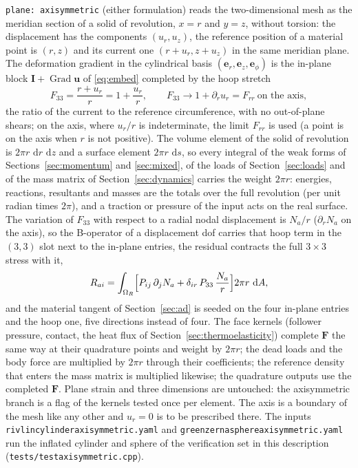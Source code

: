 \documentclass[11pt]{article}
\newcommand{\ud}{\,\mathrm{d}}
\newcommand{\Grad}{\operatorname{Grad}}
\newcommand{\bu}{\bm{u}}
\newcommand{\be}{\bm{e}}
\newcommand{\bF}{\bm{F}}
\newcommand{\bI}{\bm{I}}
\DeclareRobustCommand{\code}[1]{{\def\_{\textunderscore\allowbreak}\texttt{#1}}}
\DeclareRobustCommand{\file}[1]{{\def\_{\textunderscore\allowbreak}\texttt{#1}}}
\begin{document}
\code{plane: axisymmetric} (either formulation) reads the two-dimensional
mesh as the meridian section of a solid of revolution, $x = r$ and $y = z$,
without torsion: the displacement has the components $(u_r, u_z)$, the
reference position of a material point is $(r, z)$ and its current one
$(r + u_r, z + u_z)$ in the same meridian plane.  The deformation gradient
in the cylindrical basis $(\be_r, \be_z, \be_\phi)$ is the in-plane block
$\bI + \Grad\bu$ of \eqref{eq:embed} completed by the hoop stretch
\begin{equation}
  F_{33} = \frac{r + u_r}{r} = 1 + \frac{u_r}{r},
  \qquad F_{33} \to 1 + \partial_r u_r = F_{rr} \ \text{on the axis},
  \label{eq:hoop}
\end{equation}
the ratio of the current to the reference circumference, with no
out-of-plane shears; on the axis, where $u_r/r$ is indeterminate, the limit
$F_{rr}$ is used (a point is on the axis when $r$ is not positive).  The
volume element of the solid of revolution is $2\pi r\,\ud r\,\ud z$ and a
surface element $2\pi r\,\ud s$, so every integral of the weak forms of
Sections~\ref{sec:momentum} and \ref{sec:mixed}, of the loads of
Section~\ref{sec:loads} and of the mass matrix of Section~\ref{sec:dynamics}
carries the weight $2\pi r$: energies, reactions, resultants and masses are
the totals over the full revolution (per unit radian times $2\pi$), and a
traction or pressure of the input acts on the real surface.  The variation
of $F_{33}$ with respect to a radial nodal displacement is $N_a/r$
($\partial_r N_a$ on the axis), so the B-operator of a displacement dof
carries that hoop term in the $(3, 3)$ slot next to the in-plane entries,
the residual contracts the full $3\times3$ stress with it,
\begin{equation}
  R_{ai} = \int_{\Omega_R} \Bigl[P_{ij}\,\partial_j N_a + \delta_{ir}\,P_{33}\,\frac{N_a}{r}\Bigr] 2\pi r\,\ud A,
\end{equation}
and the material tangent of Section~\ref{sec:ad} is seeded on the four
in-plane entries and the hoop one, five directions instead of four.  The
face kernels (follower pressure, contact, the heat flux of
Section~\ref{sec:thermoelasticity}) complete $\bF$ the same way at their
quadrature points and weight by $2\pi r$; the dead loads and the body force
are multiplied by $2\pi r$ through their coefficients; the reference
density that enters the mass matrix is multiplied likewise; the quadrature
outputs use the completed $\bF$.  Plane strain and three dimensions are
untouched: the axisymmetric branch is a flag of the kernels tested once per
element.  The axis is a boundary of the mesh like any other and $u_r = 0$
is to be prescribed there.  The inputs
\file{rivlin\_cylinder\_axisymmetric.yaml} and
\file{green\_zerna\_sphere\_axisymmetric.yaml} run the inflated cylinder
and sphere of the verification set in this description
(\file{tests/test\_axisymmetric.cpp}).
\end{document}
